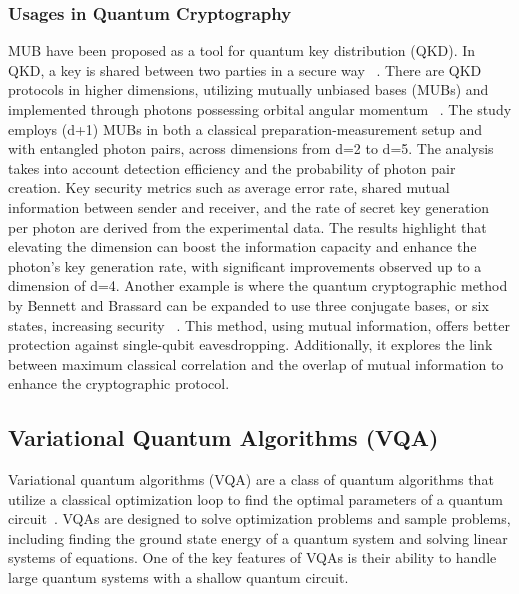 \subsubsection{Usages in Quantum Cryptography}
MUB have been proposed as a tool for quantum key distribution (QKD).
In QKD, a key is shared between two parties in a secure way ~\cite{bennet1984quantum}. There are QKD protocols in higher dimensions,
utilizing mutually unbiased bases (MUBs) and implemented
through photons possessing orbital angular momentum ~\cite{mafu2013higher}.
The study employs (d+1) MUBs in both a classical preparation-measurement setup and with entangled photon pairs,
across dimensions from d=2 to d=5. The analysis takes into account detection efficiency and the probability of photon pair creation.
Key security metrics such as average error rate, shared mutual information between sender and receiver,
and the rate of secret key generation per photon are derived from the experimental data.
The results highlight that elevating the dimension can boost the information capacity and enhance the
photon's key generation rate, with significant improvements observed up to a dimension of d=4.
Another example is where the quantum cryptographic method by Bennett and Brassard can be expanded to use three conjugate bases, or six states, increasing security ~\cite{bruss1998optimal}.
This method, using mutual information, offers better protection against single-qubit eavesdropping.
Additionally, it explores the link between maximum classical correlation and the overlap of mutual information to enhance the cryptographic protocol.

\subsection{Variational Quantum Algorithms (VQA)}\label{subsec:variational-quantum-algorithms}
Variational quantum algorithms (VQA) are a class of quantum algorithms that utilize a classical optimization loop to
find the optimal parameters of a quantum circuit~\cite{cerezo2021variational}.
VQAs are designed to solve optimization problems and sample problems,
including finding the ground state energy of a quantum system and solving linear systems of equations. One of the key features
of VQAs is their ability to handle large quantum systems with a shallow quantum circuit.


